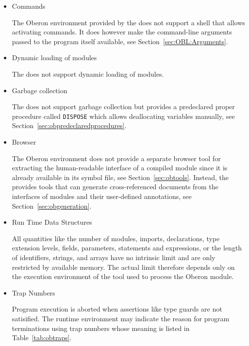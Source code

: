 \begin{itemize}

\item Commands

The Oberon environment provided by the \ecs{} does not support a shell that allows activating commands.
It does however make the command-line arguments passed to the program itself available, see Section~\ref{sec:OBL:Arguments}.

\item Dynamic loading of modules

The \ecs{} does not support dynamic loading of modules.

\item Garbage collection

The \ecs{} does not support garbage collection but provides a predeclared proper procedure called \texttt{DISPOSE} which allows deallocating variables manually, see Section~\ref{sec:obpredeclaredprocedures}.

\item Browser

The Oberon environment does not provide a separate browser tool for extracting the human-readable interface of a compiled module since it is already available in its symbol file, see Section~\ref{sec:obtools}.
Instead, the \ecs{} provides tools that can generate cross-referenced documents from the interfaces of modules and their user-defined annotations, see Section~\ref{sec:obgeneration}.

\item Run Time Data Structures

All quantities like the number of modules, imports, declarations, type extension levels, fields, parameters, statements and expressions, or the length of identifiers, strings, and arrays have no intrinsic limit and are only restricted by available memory.
The actual limit therefore depends only on the execution environment of the tool used to process the Oberon module.

\item Trap Numbers

Program execution is aborted when assertions like type guards are not satisified.
The runtime environment may indicate the reason for program terminations using trap numbers whose meaning is listed in Table~\ref{tab:obtraps}.


\end{itemize}
